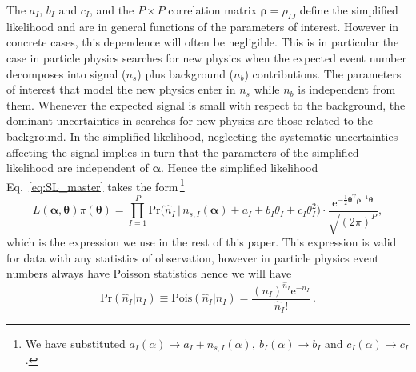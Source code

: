 \documentclass[11pt]{article}
\newcommand{\be}{\begin{equation}}
\newcommand{\ee}{\end{equation}}
\begin{document}
The $a_I$, $b_I$ and $c_I$, and the $P\times P$ correlation matrix $\bm{\rho}=\rho_{IJ}$ define the simplified likelihood and are in general functions of the parameters of interest. However in concrete cases, this dependence will often be negligible. This is in particular the case in particle physics searches for new physics when the expected event number decomposes into signal ($n_s$) plus background ($n_b$) contributions. The parameters of interest that model the new physics enter in $n_s$ while $n_b$ is independent from them.  Whenever the expected signal is small with respect to the background, the dominant uncertainties in searches for new physics are those related to the background.
In the simplified likelihood, neglecting the systematic uncertainties affecting the signal implies in turn that the parameters of the simplified likelihood are independent of $\bm \alpha$. Hence the simplified likelihood Eq.~\eqref{eq:SL_master} takes the form\,\footnote{We have substituted
$a_I(\alpha)\rightarrow a_I+n_{s,I}(\alpha),~b_I(\alpha)\rightarrow b_I$ and $c_I(\alpha)\rightarrow c_I$.}
\begin{equation}
L(\bm{\alpha},\bm{\theta} )\pi(\bm{\theta}) =
\prod_{I=1}^P \mathrm{Pr}\Big( \hat{n}_I \, \Big| \, n_{s,I}(\bm{\alpha})+a_I+ b_I\theta_I+c_I\theta_I^2  \Big) \cdot
\frac{ \mathrm{e}^{ \textstyle-\frac{1}{2}\bm{\theta}^\mathrm{T} \bm{\rho}^{-1} \bm{\theta} }}{\sqrt{(2\pi)^P}},
\label{eq:SL_LHC}
\end{equation}
which is the expression we use in the rest of this paper. This expression is valid for data with any statistics of observation, however in particle physics event numbers always have Poisson statistics hence we will have
\be
\textrm{Pr}(\hat{n}_{I}|n_{I}) \equiv \textrm{Pois}(\hat{n}_{I}|n_{I}) = \dfrac{(n_{I})^{\hat{n}_{I}} \mathrm{e}^{-n_{I}}}{\hat{n}_{I}!} \, .
\ee
\end{document}
